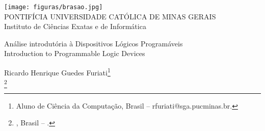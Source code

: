 \documentclass[a4paper,12pt,Times]{article}
\makeatletter
\newcommand{\monog}{Análise introdutória à Dispositivos Lógicos Programáveis }
\newcommand{\monogES}{Introduction to Programmable Logic Devices}
\newcommand{\origem}{Brasil }
\newcommand{\AutorA}{Ricardo Henrique Guedes Furiati}
\newcommand{\funcaoA}{}
\newcommand{\emailA}{rfuriati@sga.pucminas.br}
\newcommand{\cursA}{Aluno de Ciência da Computação}
\newcommand{\keyword}[1]{\textsf{#1}}
\makeatother
\begin{document}

\begin{center}
\texttt{[image: figuras/brasao.jpg]} \\
PONTIFÍCIA UNIVERSIDADE CATÓLICA DE MINAS GERAIS \\
Instituto de Ciências Exatas e de Informática


\end{center}

\vspace{0cm} {
 \singlespacing \Large{\monog {} \\ }
  \normalsize{\monogES}
 }
\vspace{1.0cm}

\begin{flushright}
\singlespacing 
\normalsize{\AutorA \footnote{\funcaoA \cursA, \origem -- \emailA . }} \\
\normalsize{\AutorB \footnote{\funcaoB \cursB, \origem -- \emailB . }} \\

\end{flushright}
\thispagestyle{empty}

\vspace{1.0cm}

\begin{abstract}
\noindent
O seguinte artigo visa expor alguns conceitos básicos relacionados à Dispositivos lógicos programáveis (PLC's), diferenciando modelos e aplicações. O desenvolviemento do artigo fundamenta-se num primeiro contato com dispositivos e aplicações de sistemas digitais, relacionando-se com a disciplina de arquitetura de computadores.
\\\textbf{\keyword{Palavras-chave: }} PLC. Sistemas Digitais. Circuitos Integrados.
\end{abstract}

 \newpage    %
\begin{abstract}
\noindent
The present article aims to aproach some basic concepts related to Programmable Logic Devices (PLCs), by diferentiating its models and applications. The development of the article is based in the first contact with digital systems and its applications, with the focus on the topic of computer architecture.
\\\textbf{\keyword{Keywords: }} PLC. Digital Systems. Integrated Circuits.
\end{abstract}
\end{document}
